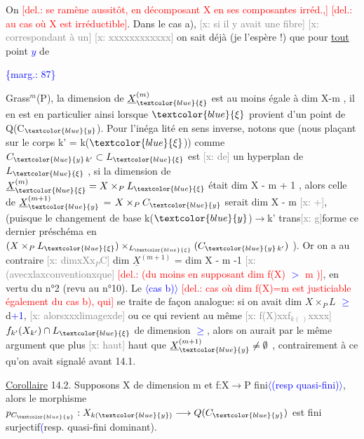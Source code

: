 \documentclass[11pt]{article}
\newcommand{\scanpage}[1]{\par\bigskip\noindent{\small\sffamily[scan #1]}\par}
\newcommand{\mspage}[1]{{\small\sffamily[p.\,#1]}}
\newcommand{\hand}[1]{\textcolor{blue}{#1}}
\let\over\relax
\newcommand{\over}[2]{\textcolor{gray}{#1}\textcolor{blue}{\ensuremath{^{\!\nearrow}}#2}}
\newcommand{\inserted}[2][]{\textcolor{blue}{$\langle$#2$\rangle$}}
\newcommand{\margin}[1]{\textcolor{blue}{\{\textsf{marg.:} #1\}}}
\newcommand{\deleted}[1]{\textcolor{red}{[\textsf{del.:} #1]}}
\newcommand{\xout}[1]{\textcolor{gray}{[\textsf{x:} #1]}}
\newcommand{\uline}[1]{\underline{#1}}
\begin{document}
On \deleted{se ramène aussitôt, en décomposant X en ses composantes irréd.,}
\deleted{au cas où X est irréductible}. Dans le cas a), \xout{si il y avait une fibre}
\xout{correspondant à un} \xout{xxxxxxxxxxxx} on sait déjà (je l'espère !) que pour \uline{tout}  point \hand{$y$} de

\margin{87}

\clearpage
\scanpage{25/88}
\mspage{\hand{82}}

Grass$^{m}$(P), la dimension de $\underline{X}^{(m)}_{\hand{\xi}}$ est au moins égale à dim X-m , il en est
en particulier ainsi lorsque $\hand{\xi}$ provient d'un point de Q(C$_{\hand{y}}$). Pour l'inéga
lité en sens inverse, notons que (nous plaçant sur le corps k' = k($\hand{\xi}$))
comme $C_{\hand{y}\,k'} \subset L_{\hand{\xi}}$ est \xout{de} un hyperplan de $L_{\hand{\xi}}$ , si la dimension de
$\underline{X}^{(m)}_{\hand{\xi}} = X\times_{P}L_{\hand{\xi}}$ était \over{>}{$\geqslant$} dim X - m + 1 , alors celle de $\underline{X}^{(m+1)}_{\hand{y}}$ =
$X\times_{P}C_{\hand{y}}$ serait \over{>}{$\geqslant$} dim X - m \xout{+}, (puisque le changement de base k($\hand{y}$)$\to$k'
trans\xout{g}forme ce dernier préschéma en $(X\times_{P}L_{\hand{\xi}})\times_{L_{\hand{\xi}}}(C_{\hand{y}\,k'})$ ). Or on a au
contraire \xout{dimxXx$_{P}$C} dim $\underline{X}^{(m+1)}$ = dim X - m -1 \xout{(avecxlaxconventionxque}
\deleted{(du moins en supposant dim f(X) \hand{$>$} m )}, en vertu du n°2 (revu au n°10).
Le \inserted{cas b)} \deleted{cas où dim f(X)=m est justiciable également du cas b), qui} se traite
de façon analogue: si on avait dim $X\times_{P}L$ \hand{$\geqslant$} d\hand{+1}, \xout{alorsxxxlimagexde} ou
ce qui revient au même \xout{f(X)xxf$_{k(\ )}$xxxx} $f_{k'}(X_{k'}) \cap L_{\hand{\xi}}$ de dimension \hand{$\geqslant$}\over{0}{1},
alors on aurait par le même argument que plus \xout{haut} haut que
$\underline{X}^{(m+1)}_{\hand{y}} \neq \emptyset$ , contrairement à ce qu'on avait signalé avant 14.1.

\uline{Corollaire} 14.2. Supposons X de dimension m et f:X$\to$P fini\inserted{(resp quasi-fini)}, alors
le morphisme $p_{C_{\hand{y}}} : X_{k(\hand{y})} \longrightarrow Q(C_{\hand{y}})$ est fini surjectif\hand{(}resp. quasi-fini
dominant).
\end{document}
